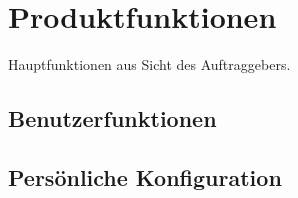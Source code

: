 \chapter{Produktfunktionen}
Hauptfunktionen aus Sicht des Auftraggebers.

\section{Benutzerfunktionen}
\section{Persönliche Konfiguration}
